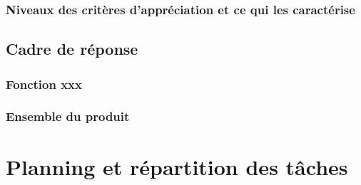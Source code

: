 \documentclass[a4paper]{article}
\begin{document}
\subsubsection{Niveaux des critères d’appréciation et ce qui les caractérise}


\subsection{Cadre de réponse}


\subsubsection{Fonction xxx}


\subsubsection{Ensemble du produit}


\section{Planning et répartition des tâches}
\end{document}
